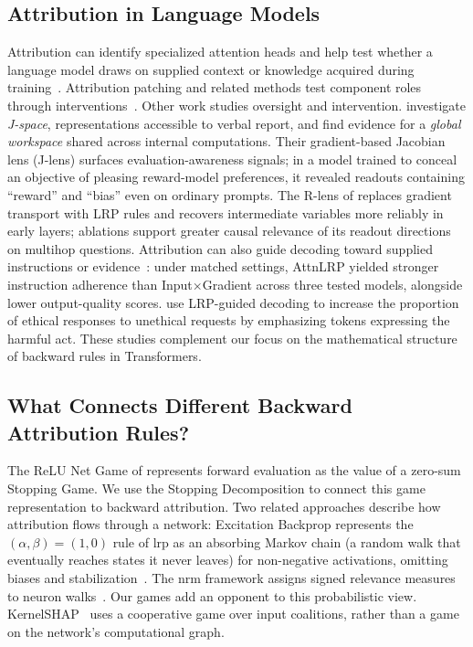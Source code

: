 \subsection{Attribution in Language Models}
Attribution can identify specialized attention heads and help test whether a language model draws on supplied context or knowledge acquired during training~\parencite{Kahardipraja2025Atlas,Voita2019}. Attribution patching and related methods test component roles through interventions~\parencite{Syed2024AttributionPatching,Kramar2024AtPStar,Hanna2024Faithfulness}. Other work studies oversight and intervention. \textcite{Gurnee2026Workspace} investigate \emph{J-space}, representations accessible to verbal report, and find evidence for a \emph{global workspace} shared across internal computations. Their gradient-based Jacobian lens (J-lens) surfaces evaluation-awareness signals; in a model trained to conceal an objective of pleasing reward-model preferences, it revealed readouts containing ``reward'' and ``bias'' even on ordinary prompts. The R-lens of \textcite{Blank2026RLens} replaces gradient transport with LRP rules and recovers intermediate variables more reliably in early layers; ablations support greater causal relevance of its readout directions on multihop questions. Attribution can also guide decoding toward supplied instructions or evidence~\parencite{Komorowski2026AGD}: under matched settings, AttnLRP yielded stronger instruction adherence than Input$\times$Gradient across three tested models, alongside lower output-quality scores. \textcite{Biton2026HiddenRequest} use LRP-guided decoding to increase the proportion of ethical responses to unethical requests by emphasizing tokens expressing the harmful act. These studies complement our focus on the mathematical structure of backward rules in Transformers.

\subsection{What Connects Different Backward Attribution Rules?}
The ReLU Net Game of \textcite{Gaubert2025} represents forward evaluation as the value of a zero-sum Stopping Game. We use the Stopping Decomposition to connect this game representation to backward attribution. Two related approaches describe how attribution flows through a network: Excitation Backprop represents the $(\alpha,\beta)=(1,0)$ rule of \ac{lrp} as an absorbing Markov chain (a random walk that eventually reaches states it never leaves) for non-negative activations, omitting biases and stabilization~\parencite{Zhang2018pointinggame}. The \ac{nrm} framework assigns signed relevance measures to neuron walks~\parencite{Xiong2026nrm}. Our games add an opponent to this probabilistic view. KernelSHAP~\parencite{LundbergLee2017} uses a cooperative game over input coalitions, rather than a game on the network's computational graph.


